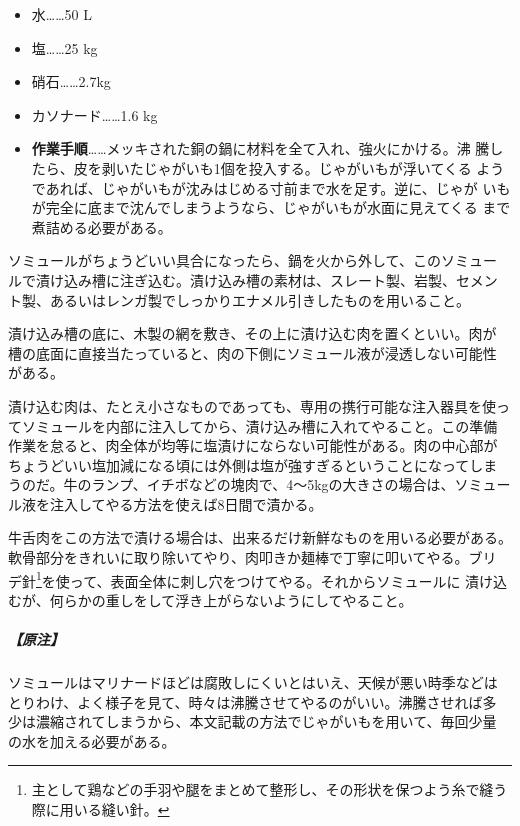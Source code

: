 \begin{recette}
\begin{itemize}
\tightlist
\item
  水\ldots{}\ldots{}50 L
\item
  塩\ldots{}\ldots{}25 kg
\item
  硝石\ldots{}\ldots{}2.7kg
\item
  カソナード\ldots{}\ldots{}1.6 kg
\item
  \textbf{作業手順}\ldots{}\ldots{}メッキされた銅の鍋に材料を全て入れ、強火にかける。沸
  騰したら、皮を剥いたじゃがいも1個を投入する。じゃがいもが浮いてくる
  ようであれば、じゃがいもが沈みはじめる寸前まで水を足す。逆に、じゃが
  いもが完全に底まで沈んでしまうようなら、じゃがいもが水面に見えてくる
  まで煮詰める必要がある。
\end{itemize}

ソミュールがちょうどいい具合になったら、鍋を火から外して、このソミュー
ルで漬け込み槽に注ぎ込む。漬け込み槽の素材は、スレート製、岩製、セメン
ト製、あるいはレンガ製でしっかりエナメル引きしたものを用いること。

漬け込み槽の底に、木製の網を敷き、その上に漬け込む肉を置くといい。肉が
槽の底面に直接当たっていると、肉の下側にソミュール液が浸透しない可能性
がある。

漬け込む肉は、たとえ小さなものであっても、専用の携行可能な注入器具を使っ
てソミュールを内部に注入してから、漬け込み槽に入れてやること。この準備
作業を怠ると、肉全体が均等に塩漬けにならない可能性がある。肉の中心部が
ちょうどいい塩加減になる頃には外側は塩が強すぎるということになってしま
うのだ。牛のランプ、イチボなどの塊肉で、4〜5kgの大きさの場合は、ソミュー
ル液を注入してやる方法を使えば8日間で漬かる。

牛舌肉をこの方法で漬ける場合は、出来るだけ新鮮なものを用いる必要がある。
軟骨部分をきれいに取り除いてやり、肉叩きか麺棒で丁寧に叩いてやる。ブリ
デ針\footnote{主として鶏などの手羽や腿をまとめて整形し、その形状を保つよう糸で縫う際に用いる縫い針。}を使って、表面全体に刺し穴をつけてやる。それからソミュールに
漬け込むが、何らかの重しをして浮き上がらないようにしてやること。

\hypertarget{observation-grande-saumure}{%
\subparagraph{【原注】}\label{observation-grande-saumure}}

ソミュールはマリナードほどは腐敗しにくいとはいえ、天候が悪い時季などは
とりわけ、よく様子を見て、時々は沸騰させてやるのがいい。沸騰させれば多
少は濃縮されてしまうから、本文記載の方法でじゃがいもを用いて、毎回少量
の水を加える必要がある。
\end{recette}